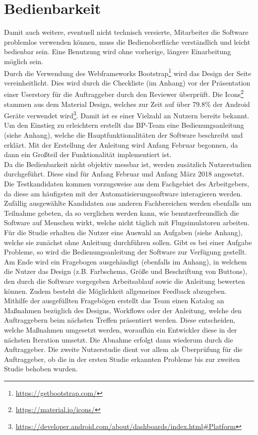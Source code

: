 \documentclass[accentcolor=tud9c,12pt,paper=a4]{tudreport}
\begin{document}
		\section{Bedienbarkeit}\label{bedienbarkeit_qs}
		Damit auch weitere, eventuell nicht technisch versierte, Mitarbeiter die Software
		problemlos verwenden können, muss die
		Bedienoberfläche verständlich und leicht bedienbar sein. Eine Benutzung wird ohne
		vorherige, längere Einarbeitung möglich sein.
		\\[5pt]
		Durch die Verwendung des Webframeworks Bootstrap\footnote{\url{https://getbootstrap.com/}}
		wird das Design der Seite vereinheitlicht. Dies wird durch die Checkliste (im Anhang)
		vor der Präsentation einer Userstory für die Auftraggeber durch den Reviewer überprüft.
		Die Icons\footnote{\url{https://material.io/icons/}}
		stammen aus dem Material Design, welches zur Zeit auf über 79.8\% der Android Geräte
		verwendet wird\footnote{\url{https://developer.android.com/about/dashboards/index.html#Platform}}. 
		Damit ist es einer Vielzahl an Nutzern bereits bekannt.
		\\[5pt]
		Um den Einstieg zu erleichtern erstellt das BP-Team eine Bedienungsanleitung (siehe Anhang),
		welche die Hauptfunktionalitäten der Software beschreibt und erklärt. Mit der Erstellung
		der Anleitung wird Anfang Februar begonnen, da dann ein Großteil der Funktionalität
		implementiert ist.
		\\[5pt]
		Da die Bedienbarkeit nicht objektiv messbar ist, werden zusätzlich Nutzerstudien durchgeführt.
		Diese sind für Anfang Februar und Anfang März 2018 angesetzt.
		Die Testkandidaten kommen vorzugsweise aus dem
		Fachgebiet des Arbeitgebers, da diese am häufigsten mit der Automatisierungssoftware interagieren werden.
		Zufällig ausgewählte Kandidaten aus anderen Fachbereichen werden ebenfalls um Teilnahme gebeten, da
		so verglichen werden kann, wie benutzerfreundlich die Software auf Menschen wirkt, welche nicht täglich
		mit Flugsimulatoren arbeiten.
		\\[5pt]
		Für die Studie erhalten die Nutzer eine Auswahl an Aufgaben (siehe Anhang), 
		welche sie zunächst ohne Anleitung durchführen sollen. 
		Gibt es bei einer Aufgabe Probleme, so wird die Bedienungsanleitung 
		der Software zur Verfügung gestellt.
		Am Ende wird ein Fragebogen ausgehändigt (ebenfalls im Anhang),
		in welchem die Nutzer das Design (z.B. Farbschema, Größe und Beschriftung von Buttons), den
		durch die Software vorgegeben Arbeitsablauf sowie die Anleitung bewerten können. Zudem
		besteht die Möglichkeit allgemeines Feedback abzugeben.
		\\[5pt]
		Mithilfe der ausgefüllten Fragebögen erstellt das Team einen Katalog an
		Maßnahmen bezüglich des Designs, Workflows oder der Anleitung, 
		welche den Auftraggebern beim nächsten Treffen präsentiert werden. 
		Diese entscheiden, welche Maßnahmen umgesetzt werden, woraufhin ein
		Entwickler diese in der nächsten Iteration umsetzt. Die Abnahme erfolgt dann
		wiederum durch die Auftraggeber.
		Die zweite Nutzerstudie dient vor allem als Überprüfung für die Auftraggeber, ob die
		in der ersten Studie erkannten Probleme bis zur zweiten Studie behoben wurden.
\end{document}
